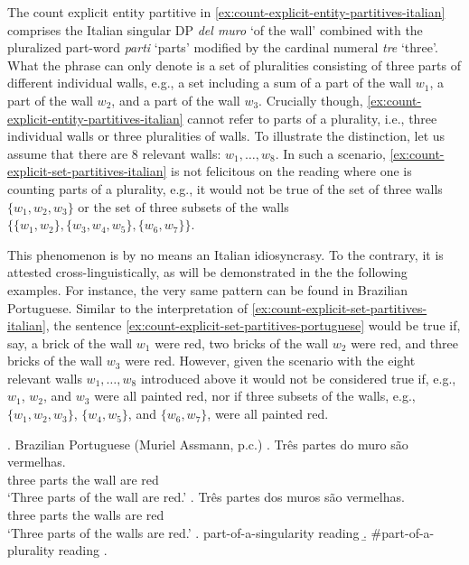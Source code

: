 The count explicit entity partitive in \ref{ex:count-explicit-entity-partitives-italian} comprises the Italian singular DP \textit{del muro} `of the wall' combined with the pluralized part-word \textit{parti} `parts' modified by the cardinal numeral \textit{tre} `three'. What the phrase can only denote is a set of pluralities consisting of three parts of different individual walls, e.g., a set including a sum of a part of the wall $w_1$, a part of the wall $w_2$, and a part of the wall $w_3$. Crucially though, \ref{ex:count-explicit-entity-partitives-italian} cannot refer to parts of a plurality, i.e., three individual walls or three pluralities of walls. To illustrate the distinction, let us assume that there are 8 relevant walls: $w_1, \dots, w_8$. In such a scenario, \ref{ex:count-explicit-set-partitives-italian} is not felicitous on the reading where one is counting parts of a plurality, e.g., it would not be true of the set of three walls $\{w_1, w_2, w_3\}$ or the set of three subsets of the walls $\{\{w_1, w_2\}, \{w_3, w_4, w_5\}, \{w_6, w_7\}\}$.

This phenomenon is by no means an Italian idiosyncrasy. To the contrary, it is attested cross-linguistically, as will be demonstrated in the the following examples. For instance, the very same pattern can be found in Brazilian Portuguese. Similar to the interpretation of \ref{ex:count-explicit-set-partitives-italian}, the sentence \ref{ex:count-explicit-set-partitives-portuguese} would be true if, say, a brick of the wall $w_1$ were red, two bricks of the wall $w_2$ were red, and three bricks of the wall $w_3$ were red. However, given the scenario with the eight relevant walls $w_1, \dots, w_8$ introduced above it would not be considered true if, e.g., $w_1$, $w_2$, and $w_3$ were all painted red, nor if three subsets of the walls, e.g., $\{w_1, w_2, w_3\}$, $\{w_4, w_5\}$, and $\{w_6, w_7\}$, were all painted red.\largerpage

		\ex.\label{ex:count-explicit-partitives-portuguese} Brazilian Portuguese (Muriel Assmann, p.c.)
		\ag. Tr{\^{e}}s partes do muro  s{\~{a}}o vermelhas.\label{ex:count-explicit-entity-partitives-portuguese}\\
		three parts the wall are red\\
		`Three parts of the wall are red.'
		\bg. Tr{\^{e}}s partes dos muros s{\~{a}}o vermelhas.\label{ex:count-explicit-set-partitives-portuguese}\\
		three parts the walls are red\\
		`Three parts of the walls are red.'
        \a. part-of-a-singularity reading
		\b. \#part-of-a-plurality reading
		\z.

